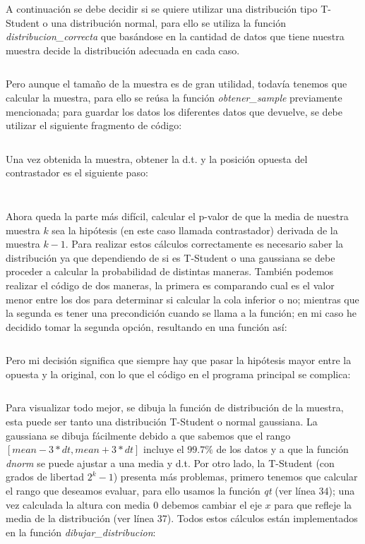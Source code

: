 \inputminted[autogobble, firstline=19, lastline=23]{R}{../R/media.R}

A continuación se debe decidir si se quiere utilizar una distribución tipo T-Student o una distribución normal, para ello se utiliza la función \textit{distribucion\_correcta} que basándose en la cantidad de datos que tiene nuestra muestra decide la distribución adecuada en cada caso.

\inputminted[firstline=10, lastline=16]{R}{../R/dependencias.R}

Pero aunque el tamaño de la muestra es de gran utilidad, todavía tenemos que calcular la muestra, para ello se reúsa la función \textit{obtener\_sample} previamente mencionada; para guardar los datos los diferentes datos que devuelve, se debe utilizar el siguiente fragmento de código:

\inputminted[autogobble, firstline=28, lastline=31]{R}{../R/media.R}

Una vez obtenida la muestra, obtener la d.t. y la posición opuesta del contrastador es el siguiente paso:

\inputminted[autogobble, firstline=33, lastline=34]{R}{../R/media.R}

\inputminted[firstline=18, lastline=24]{R}{../R/dependencias.R}

Ahora queda la parte más difícil, calcular el p-valor de que la media de nuestra muestra $k$ sea la hipótesis (en este caso llamada contrastador) derivada de la muestra $k - 1$. Para realizar estos cálculos correctamente es necesario saber la distribución ya que dependiendo de si es T-Student o una gaussiana se debe proceder a calcular la probabilidad de distintas maneras. También podemos realizar el código de dos maneras, la primera es comparando cual es el valor menor entre los dos para determinar si calcular la cola inferior o no; mientras que la segunda es tener una precondición cuando se llama a la función; en mi caso he decidido tomar la segunda opción, resultando en una función así:

\inputminted[firstline=88, lastline=98]{R}{../R/dependencias.R}

Pero mi decisión significa que siempre hay que pasar la hipótesis mayor entre la opuesta y la original, con lo que el código en el programa principal se complica:

\inputminted[autogobble, firstline=38, lastline=44]{R}{../R/media.R}

Para visualizar todo mejor, se dibuja la función de distribución de la muestra, esta puede ser tanto una distribución T-Student o normal gaussiana. La gaussiana se dibuja fácilmente debido a que sabemos que el rango $[mean - 3*dt, mean + 3*dt]$ incluye el $99.7\%$ de los datos y a que la función \textit{dnorm} se puede ajustar a una media y d.t. Por otro lado, la T-Student (con grados de libertad $2^k - 1$) presenta más problemas, primero tenemos que calcular el rango que deseamos evaluar, para ello usamos la función \textit{qt} (ver línea 34); una vez calculada la altura con media 0 debemos cambiar el eje $x$ para que refleje la media de la distribución (ver línea 37). Todos estos cálculos están implementados en la función \textit{dibujar\_distribucion}:

